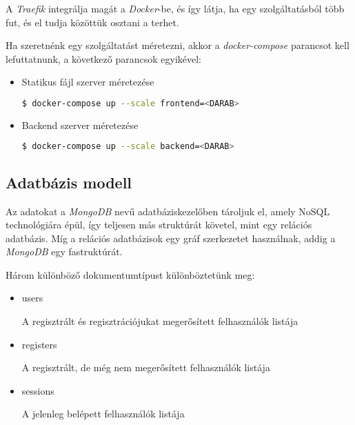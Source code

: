 A \emph{Traefik} integrálja magát a \emph{Docker}-be, és így látja, ha egy szolgáltatásból több fut, és el tudja közöttük osztani a terhet.

Ha szeretnénk egy szolgáltatást méretezni, akkor a \emph{docker-compose} parancsot kell lefuttatnunk, a következő parancsok egyikével:

\begin{itemize}
      \item Statikus fájl szerver méretezése
            \begin{lstlisting}[language=bash]
        $ docker-compose up --scale frontend=<DARAB>\end{lstlisting}
      \item Backend szerver méretezése
            \begin{lstlisting}[language=bash]
        $ docker-compose up --scale backend=<DARAB>\end{lstlisting}
\end{itemize}

\subsection{Adatbázis modell}

Az adatokat a \emph{MongoDB} nevű adatbáziskezelőben tároljuk el, amely NoSQL technológiára épül, így teljesen más struktúrát követel, mint egy relációs adatbázis. Míg a relációs adatbázisok egy gráf szerkezetet használnak, addig a \emph{MongoDB} egy fastruktúrát.


Három különböző dokumentumtípust különböztetünk meg:
\begin{itemize}
      \item users

            A regisztrált és regisztrációjukat megerősített felhasználók listája
      \item registers

            A regisztrált, de még nem megerősített felhasználók listája
      \item sessions

            A jelenleg belépett felhasználók listája
\end{itemize}

